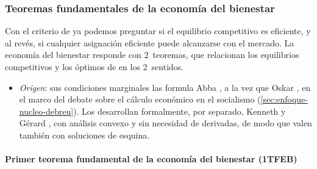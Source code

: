 \documentclass[11pt]{article}
\begin{document}
\subsubsection{Teoremas fundamentales de la economía del bienestar}\label{sec:teoremas-fundamentales-economia}

Con el criterio de  ya podemos preguntar si el equilibrio competitivo es eficiente, y al revés, si cualquier asignación eficiente puede alcanzarse con el mercado. La economía del bienestar responde con 2~teoremas, que relacionan los equilibrios competitivos y los óptimos de  en los 2~sentidos.

\begin{itemize}
\item \emph{Origen}: sus condiciones marginales las formula Abba \textcite{Lerner1934Economic,Lerner1944Economics}, a la vez que Oskar \textcite{Lange1942Foundations}, en el marco del debate sobre el cálculo económico en el socialismo (\ref{sec:enfoque-nucleo-debreu}). Los desarrollan formalmente, por separado, Kenneth \textcite{Arrow1951Extension} y Gérard \textcite{Debreu1951Coefficient}, con análisis convexo y sin necesidad de derivadas, de modo que valen también con soluciones de esquina\nocite{Debreu1959Theory}.
\end{itemize}

\paragraph{Primer teorema fundamental de la economía del bienestar (1TFEB)}
\end{document}
